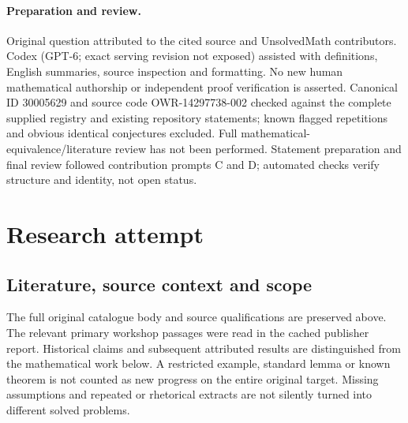 \documentclass[11pt]{article}
\begin{document}
\paragraph{Preparation and review.}
Original question attributed to the cited source and UnsolvedMath contributors. Codex (GPT-6; exact serving revision not exposed) assisted with definitions, English summaries, source inspection and formatting. No new human mathematical authorship or independent proof verification is asserted. Canonical ID 30005629 and source code OWR-14297738-002 checked against the complete supplied registry and existing repository statements; known flagged repetitions and obvious identical conjectures excluded. Full mathematical-equivalence/literature review has not been performed. Statement preparation and final review followed contribution prompts C and D; automated checks verify structure and identity, not open status.
\label{end:30005629}

\section{Research attempt}
\subsection{Literature, source context and scope}
The full original catalogue body and source qualifications are preserved above. The relevant primary workshop passages were read in the cached publisher report. Historical claims and subsequent attributed results are distinguished from the mathematical work below. A restricted example, standard lemma or known theorem is not counted as new progress on the entire original target. Missing assumptions and repeated or rhetorical extracts are not silently turned into different solved problems.
\end{document}
